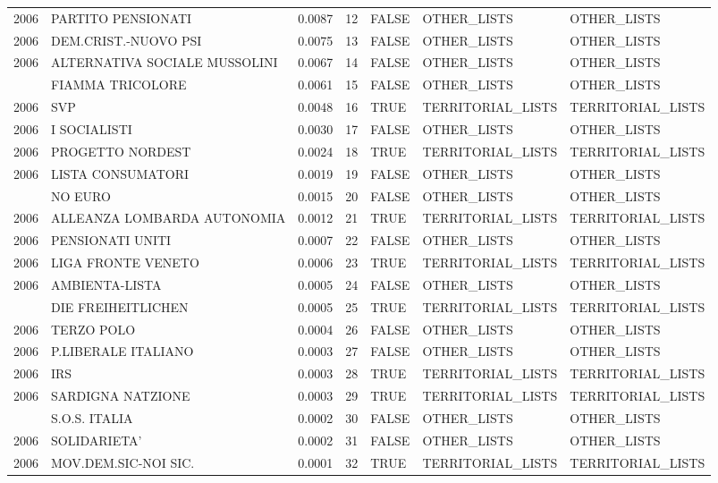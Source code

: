 \begin{longtable}[t]{rlrrlll}
2006 & PARTITO PENSIONATI & 0.0087 & 12 & FALSE & OTHER\_LISTS & OTHER\_LISTS\\
2006 & DEM.CRIST.-NUOVO PSI & 0.0075 & 13 & FALSE & OTHER\_LISTS & OTHER\_LISTS\\
2006 & ALTERNATIVA SOCIALE MUSSOLINI & 0.0067 & 14 & FALSE & OTHER\_LISTS & OTHER\_LISTS\\
\addlinespace
2006 & FIAMMA TRICOLORE & 0.0061 & 15 & FALSE & OTHER\_LISTS & OTHER\_LISTS\\
2006 & SVP & 0.0048 & 16 & TRUE & TERRITORIAL\_LISTS & TERRITORIAL\_LISTS\\
2006 & I SOCIALISTI & 0.0030 & 17 & FALSE & OTHER\_LISTS & OTHER\_LISTS\\
2006 & PROGETTO NORDEST & 0.0024 & 18 & TRUE & TERRITORIAL\_LISTS & TERRITORIAL\_LISTS\\
2006 & LISTA CONSUMATORI & 0.0019 & 19 & FALSE & OTHER\_LISTS & OTHER\_LISTS\\
\addlinespace
2006 & NO EURO & 0.0015 & 20 & FALSE & OTHER\_LISTS & OTHER\_LISTS\\
2006 & ALLEANZA LOMBARDA AUTONOMIA & 0.0012 & 21 & TRUE & TERRITORIAL\_LISTS & TERRITORIAL\_LISTS\\
2006 & PENSIONATI UNITI & 0.0007 & 22 & FALSE & OTHER\_LISTS & OTHER\_LISTS\\
2006 & LIGA FRONTE VENETO & 0.0006 & 23 & TRUE & TERRITORIAL\_LISTS & TERRITORIAL\_LISTS\\
2006 & AMBIENTA-LISTA & 0.0005 & 24 & FALSE & OTHER\_LISTS & OTHER\_LISTS\\
\addlinespace
2006 & DIE FREIHEITLICHEN & 0.0005 & 25 & TRUE & TERRITORIAL\_LISTS & TERRITORIAL\_LISTS\\
2006 & TERZO POLO & 0.0004 & 26 & FALSE & OTHER\_LISTS & OTHER\_LISTS\\
2006 & P.LIBERALE ITALIANO & 0.0003 & 27 & FALSE & OTHER\_LISTS & OTHER\_LISTS\\
2006 & IRS & 0.0003 & 28 & TRUE & TERRITORIAL\_LISTS & TERRITORIAL\_LISTS\\
2006 & SARDIGNA NATZIONE & 0.0003 & 29 & TRUE & TERRITORIAL\_LISTS & TERRITORIAL\_LISTS\\
\addlinespace
2006 & S.O.S. ITALIA & 0.0002 & 30 & FALSE & OTHER\_LISTS & OTHER\_LISTS\\
2006 & SOLIDARIETA' & 0.0002 & 31 & FALSE & OTHER\_LISTS & OTHER\_LISTS\\
2006 & MOV.DEM.SIC-NOI SIC. & 0.0001 & 32 & TRUE & TERRITORIAL\_LISTS & TERRITORIAL\_LISTS\\

\end{longtable}
